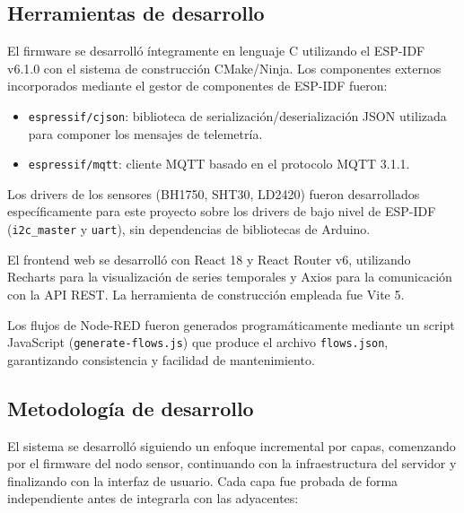\subsection{Herramientas de desarrollo}

El firmware se desarrolló íntegramente en lenguaje C utilizando el ESP-IDF v6.1.0
con el sistema de construcción CMake/Ninja. Los componentes externos incorporados
mediante el gestor de componentes de ESP-IDF fueron:
\begin{itemize}
  \item \texttt{espressif/cjson}: biblioteca de serialización/deserialización JSON
        utilizada para componer los mensajes de telemetría.
  \item \texttt{espressif/mqtt}: cliente MQTT basado en el protocolo MQTT 3.1.1.
\end{itemize}

Los drivers de los sensores (BH1750, SHT30, LD2420) fueron desarrollados
específicamente para este proyecto sobre los drivers de bajo nivel de ESP-IDF
(\texttt{i2c\_master} y \texttt{uart}), sin dependencias de bibliotecas de Arduino.

El frontend web se desarrolló con React 18 y React Router v6, utilizando Recharts
para la visualización de series temporales y Axios para la comunicación con la
API REST. La herramienta de construcción empleada fue Vite 5.

Los flujos de Node-RED fueron generados programáticamente mediante un script
JavaScript (\texttt{generate-flows.js}) que produce el archivo \texttt{flows.json},
garantizando consistencia y facilidad de mantenimiento.

\subsection{Metodología de desarrollo}

El sistema se desarrolló siguiendo un enfoque incremental por capas, comenzando por
el firmware del nodo sensor, continuando con la infraestructura del servidor y
finalizando con la interfaz de usuario. Cada capa fue probada de forma independiente
antes de integrarla con las adyacentes:

